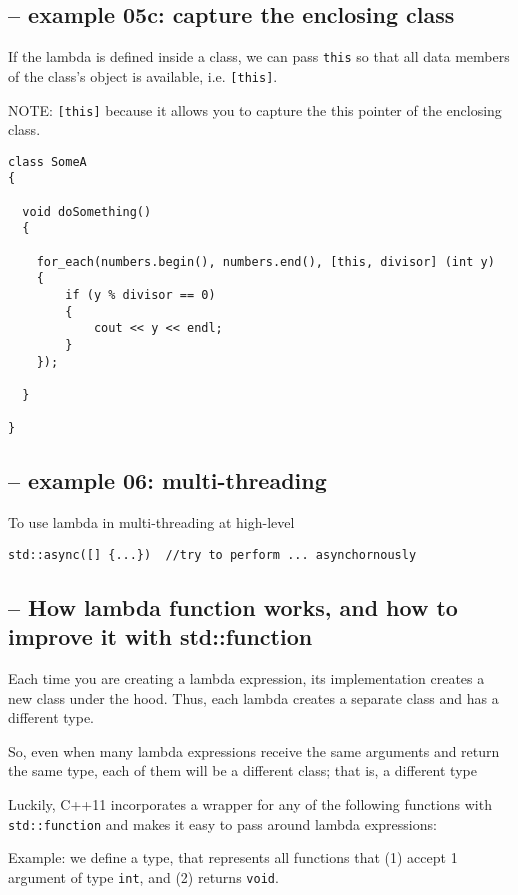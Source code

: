 \subsection{-- example 05c: capture the enclosing class}

If the lambda is defined inside a class, we can pass \verb!this! so that all data members of the class's object is available,
i.e. \verb![this]!.

NOTE: \verb![this]! because it allows you to capture the this pointer of the enclosing class.
 
\begin{verbatim}
class SomeA
{

  void doSomething()
  {
    
    for_each(numbers.begin(), numbers.end(), [this, divisor] (int y)
    {
        if (y % divisor == 0)
        {
            cout << y << endl;
        }
    });
  
  }

}
\end{verbatim}


\subsection{-- example 06: multi-threading}

To use lambda in multi-threading at high-level 
\begin{verbatim}
std::async([] {...})  //try to perform ... asynchornously
\end{verbatim}

\subsection{-- How lambda function works, and how to improve it with std::function}
\label{sec:std::function}

Each time you are creating a lambda expression, its implementation creates a new
class under the hood. Thus, each lambda creates a separate class and has a
different type.

So, even when many lambda expressions receive the same arguments and return the
same type, each of them will be a different class; that is, a different type


Luckily, C++11 incorporates a wrapper for any of the following functions with
\verb!std::function! and makes it easy to pass around lambda expressions:

Example: we define a type, that represents all functions that 
(1) accept 1 argument of type \verb!int!, and (2) returns \verb!void!.


